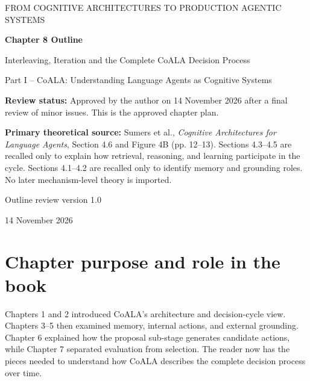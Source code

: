 


\thispagestyle{empty}
\begin{center}
{\sffamily\Large\color{BookBlue} FROM COGNITIVE ARCHITECTURES TO PRODUCTION AGENTIC SYSTEMS\par}
\vspace{1.2cm}
{\sffamily\huge\bfseries\color{BookBlue} Chapter 8 Outline\par}
\vspace{0.45cm}
{\sffamily\LARGE Interleaving, Iteration and the Complete CoALA Decision Process\par}
\vspace{0.8cm}
{\large Part I -- CoALA: Understanding Language Agents as Cognitive Systems\par}
\vfill
\begin{learningbox}
\textbf{Review status:} Approved by the author on 14 November 2026 after a final review of minor issues. This is the approved chapter plan.

\textbf{Primary theoretical source:} Sumers et al., \emph{Cognitive Architectures for Language Agents}, Section 4.6 and Figure 4B (pp. 12--13). Sections 4.3--4.5 are recalled only to explain how retrieval, reasoning, and learning participate in the cycle. Sections 4.1--4.2 are recalled only to identify memory and grounding roles. No later mechanism-level theory is imported.
\end{learningbox}
\vfill
{\sffamily\large Outline review version 1.0\par}
{\small 14 November 2026\par}
\end{center}
\clearpage

\setcounter{chapter}{8}
\section{Chapter purpose and role in the book}
Chapters 1 and 2 introduced CoALA's architecture and decision-cycle view. Chapters 3--5 then examined memory, internal actions, and external grounding. Chapter 6 explained how the proposal sub-stage generates candidate actions, while Chapter 7 separated evaluation from selection. The reader now has the pieces needed to understand how CoALA describes the complete decision process over time.

